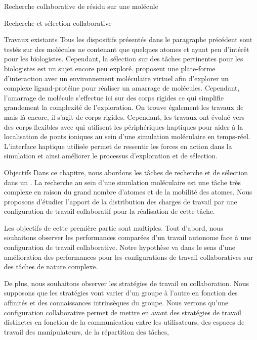 \documentclass[myfrancais]{mythesis}
\begin{document}
\begin{mychapter}{Recherche collaborative de résidu sur une molécule}
\begin{mysection}{Recherche et sélection collaborative}
\begin{mysubsection}{Travaux existants}
				Tous les dispositifs présentés dans le paragraphe précédent sont testés sur des molécules ne contenant que quelques atomes et ayant peu d'intérêt pour les biologistes.
				Cependant, la sélection sur des tâches pertinentes pour les biologistes est un sujet encore peu exploré.
				 proposent une plate-forme d'interaction avec un environnement moléculaire virtuel afin d'explorer un complexe ligand-protéine pour réaliser un amarrage de molécules.
				Cependant, l'amarrage de molécule s'effectue ici sur des corps rigides ce qui simplifie grandement la complexité de l'exploration.
				On trouve également les travaux de  mais là encore, il s'agit de corps rigides.
				Cependant, les travaux ont évolué vers des corps flexibles avec  qui utilisent les périphériques haptiques pour aider à la localisation de ponts ioniques au sein d'une simulation moléculaire en temps-réel.
				L'interface haptique utilisée permet de ressentir les forces en action dans la simulation et ainsi améliorer le processus d'exploration et de sélection.
			\end{mysubsection}
			\begin{mysubsection}{Objectifs}
				Dans ce chapitre, nous abordons les tâches de recherche et de sélection dans un .
				La recherche au sein d'une simulation moléculaire est une tâche très complexe en raison du grand nombre d'atomes et de la mobilité des atomes.
				Nous proposons d'étudier l'apport de la distribution des charges de travail par une configuration de travail collaboratif pour la réalisation de cette tâche.

				Les objectifs de cette première partie sont multiples.
				Tout d'abord, nous souhaitons observer les performances comparées d'un travail autonome face à une configuration de travail collaborative.
				Notre hypothèse va dans le sens d'une amélioration des performances pour les configurations de travail collaboratives sur des tâches de nature complexe.

				De plus, nous souhaitons observer les stratégies de travail en collaboration.
				Nous supposons que les stratégies vont varier d'un groupe à l'autre en fonction des affinités et des connaissances intrinsèques du groupe.
				Nous verrons qu'une configuration collaborative permet de mettre en avant des stratégies de travail distinctes en fonction de la communication entre les utilisateurs, des espaces de travail des manipulateurs, de la répartition des tâches, \myetc


\end{mysubsection}
\end{mysection}
\end{mychapter}
\end{document}
